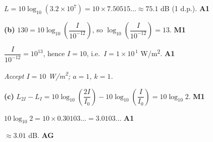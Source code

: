 \documentclass[12pt, twoside]{article}
\begin{document}
\begin{enumerate}[itemsep=0.3cm]
$L = 10\log_{10}(3.2 \times 10^{7}) = 10 \times 7.50515\ldots
\approx 75.1$ dB (1 d.p.). \hfill \textbf{A1}

\medskip

\textbf{(b)} $130 = 10\log_{10}\!\left(\dfrac{I}{10^{-12}}\right)$, so
$\log_{10}\!\left(\dfrac{I}{10^{-12}}\right) = 13$. \hfill \textbf{M1}

$\dfrac{I}{10^{-12}} = 10^{13}$, hence $I = 10$, i.e.\
$I = 1 \times 10^{\,1}$ W/m\textsuperscript{2}. \hfill \textbf{A1}

\emph{Accept $I = 10$ W/m\textsuperscript{2}; $a = 1$, $k = 1$.}

\medskip

\textbf{(c)} $L_{2I} - L_{I}
= 10\log_{10}\!\left(\dfrac{2I}{I_{0}}\right)
- 10\log_{10}\!\left(\dfrac{I}{I_{0}}\right)
= 10\log_{10} 2$. \hfill \textbf{M1}

$10\log_{10} 2 = 10 \times 0.30103\ldots = 3.0103\ldots$ \hfill \textbf{A1}

$\approx 3.01$ dB. \hfill \textbf{AG}

\end{enumerate}
\end{document}
